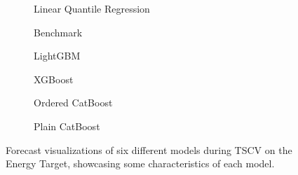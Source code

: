 \begin{figure}[htbp]
    \centering
    \begin{subfigure}[b]{0.5\textwidth}
        \centering
        
        \caption{Linear Quantile Regression}
        \label{fig:small-orfe-energy}
    \end{subfigure}%
    \begin{subfigure}[b]{0.5\textwidth}
        \centering
        
        \caption{Benchmark}
        \label{fig:armed-play-energy}
    \end{subfigure}

    \begin{subfigure}[b]{0.5\textwidth}
        \centering
        
        \caption{LightGBM}
        \label{fig:mangy-flux-energy}
    \end{subfigure}%
    \begin{subfigure}[b]{0.5\textwidth}
        \centering
        
        \caption{XGBoost}
        \label{fig:couth-ruby-energy}
    \end{subfigure}
    
    \begin{subfigure}[b]{0.5\textwidth}
        \centering
        
        \caption{Ordered CatBoost}
        \label{fig:civil-leas-energy}
    \end{subfigure}%
    \begin{subfigure}[b]{0.5\textwidth}
        \centering
        
        \caption{Plain CatBoost}
        \label{fig:blear-dita-energy}
    \end{subfigure}%
    
    \caption{Forecast visualizations of six different models during TSCV on the Energy Target, showcasing some characteristics of each model.}
    \label{fig:energy_forecast}
\end{figure}


